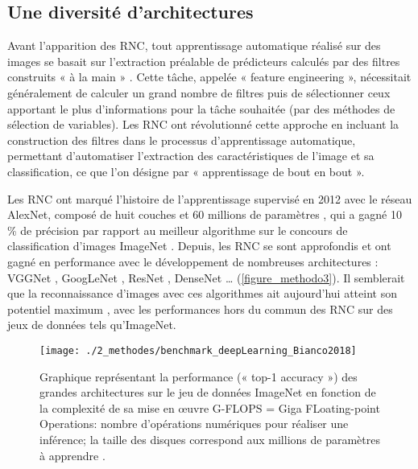 \subsection{Une diversité d'architectures}

Avant l’apparition des RNC, tout apprentissage automatique réalisé sur des images se basait sur l’extraction préalable de prédicteurs calculés par des filtres construits « à la main » \citep{kumar_detailed_2014}. Cette tâche, appelée « feature engineering », nécessitait généralement de calculer un grand nombre de filtres puis de sélectionner ceux apportant le plus d’informations pour la tâche souhaitée (par des méthodes de sélection de variables). Les RNC ont révolutionné cette approche en incluant la construction des filtres dans le processus d’apprentissage automatique, permettant d’automatiser l’extraction des caractéristiques de l’image et sa classification, ce que l’on désigne par « apprentissage de bout en bout ».

Les RNC ont marqué l’histoire de l’apprentissage supervisé en 2012 avec le réseau AlexNet, composé de huit couches et 60 millions de paramètres \citep{krizhevsky_imagenet_2012}, qui a gagné 10 \% de précision par rapport au meilleur algorithme sur le concours de classification d’images ImageNet \citep{deng_imagenet:_2009}. Depuis, les RNC se sont approfondis et ont gagné en performance avec le développement de nombreuses architectures : VGGNet \citep{simonyan_very_2015}, GoogLeNet \citep{szegedy_going_2015}, ResNet \citep{he_deep_2016}, DenseNet \citep{huang_densely_2017}… (\autoref{figure_methodo3}). Il semblerait que la reconnaissance d’images avec ces algorithmes ait aujourd’hui atteint son potentiel maximum \citep{rawat_deep_2017}, avec les performances hors du commun des RNC sur des jeux de données tels qu’ImageNet. 

\begin{figure}[H]
	\begin{center}
	\texttt{[image: ./2\_methodes/benchmark\_deepLearning\_Bianco2018]}
		\caption[Graphique représentant la performance (« top-1 accuracy ») des grandes architectures sur le jeu de données ImageNet]{Graphique représentant la performance (« top-1 accuracy ») des grandes architectures sur le jeu de données ImageNet en fonction de la complexité de sa mise en œuvre  G-FLOPS = Giga FLoating-point Operations: nombre d’opérations numériques pour réaliser une inférence; la taille des disques correspond aux millions de paramètres à apprendre \citep{bianco_benchmark_2018}.}
	\label{figure_methodo3}
\end{center}
\end{figure}

